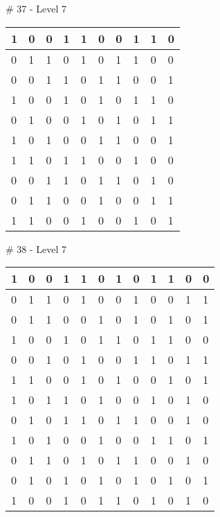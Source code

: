 \smallskip

\# 37 - Level 7 \newline
\begin{tabular}{|m{\collen}|m{\collen}|m{\collen}|m{\collen}|m{\collen}|m{\collen}|m{\collen}|m{\collen}|m{\collen}|m{\collen}|}
\hline
  1 & 0 & 0 & 1 & 1 & 0 & 0 & 1 & 1 & 0 \\
\hline
  0 & 1 & 1 & 0 & 1 & 0 & 1 & 1 & 0 & 0 \\
\hline
  0 & 0 & 1 & 1 & 0 & 1 & 1 & 0 & 0 & 1 \\
\hline
  1 & 0 & 0 & 1 & 0 & 1 & 0 & 1 & 1 & 0 \\
\hline
  0 & 1 & 0 & 0 & 1 & 0 & 1 & 0 & 1 & 1 \\
\hline
  1 & 0 & 1 & 0 & 0 & 1 & 1 & 0 & 0 & 1 \\
\hline
  1 & 1 & 0 & 1 & 1 & 0 & 0 & 1 & 0 & 0 \\
\hline
  0 & 0 & 1 & 1 & 0 & 1 & 1 & 0 & 1 & 0 \\
\hline
  0 & 1 & 1 & 0 & 0 & 1 & 0 & 0 & 1 & 1 \\
\hline
  1 & 1 & 0 & 0 & 1 & 0 & 0 & 1 & 0 & 1 \\
\hline
\end{tabular}


\smallskip

\# 38 - Level 7 \newline
\begin{tabular}{|m{\collen}|m{\collen}|m{\collen}|m{\collen}|m{\collen}|m{\collen}|m{\collen}|m{\collen}|m{\collen}|m{\collen}|m{\collen}|m{\collen}|}
\hline
  1 & 0 & 0 & 1 & 1 & 0 & 1 & 0 & 1 & 1 & 0 & 0 \\
\hline
  0 & 1 & 1 & 0 & 1 & 0 & 0 & 1 & 0 & 0 & 1 & 1 \\
\hline
  0 & 1 & 1 & 0 & 0 & 1 & 0 & 1 & 0 & 1 & 0 & 1 \\
\hline
  1 & 0 & 0 & 1 & 0 & 1 & 1 & 0 & 1 & 1 & 0 & 0 \\
\hline
  0 & 0 & 1 & 0 & 1 & 0 & 0 & 1 & 1 & 0 & 1 & 1 \\
\hline
  1 & 1 & 0 & 0 & 1 & 0 & 1 & 0 & 0 & 1 & 0 & 1 \\
\hline
  1 & 0 & 1 & 1 & 0 & 1 & 0 & 0 & 1 & 0 & 1 & 0 \\
\hline
  0 & 1 & 0 & 1 & 1 & 0 & 1 & 1 & 0 & 0 & 1 & 0 \\
\hline
  1 & 0 & 1 & 0 & 0 & 1 & 0 & 0 & 1 & 1 & 0 & 1 \\
\hline
  0 & 1 & 1 & 0 & 1 & 0 & 1 & 1 & 0 & 0 & 1 & 0 \\
\hline
  0 & 1 & 0 & 1 & 0 & 1 & 0 & 1 & 0 & 1 & 0 & 1 \\
\hline
  1 & 0 & 0 & 1 & 0 & 1 & 1 & 0 & 1 & 0 & 1 & 0 \\
\hline
\end{tabular}


